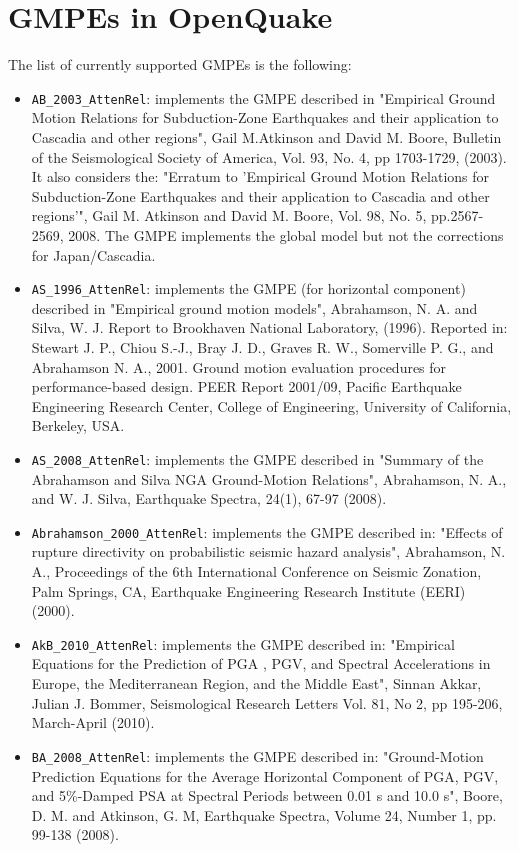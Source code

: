 \section{GMPEs in OpenQuake}
\label{app:gmpes}
The list of currently supported GMPEs is the following:
\begin{itemize}
\item \Verb+AB_2003_AttenRel+: implements the GMPE described in "Empirical Ground Motion Relations for Subduction-Zone Earthquakes and their application to Cascadia and other regions", Gail M.Atkinson and David M. Boore, Bulletin of the Seismological Society of America, Vol. 93, No. 4, pp 1703-1729, (2003).  It also considers the: "Erratum to 'Empirical Ground Motion Relations for Subduction-Zone Earthquakes and their application to Cascadia and other regions'", Gail M. Atkinson and David M. Boore, Vol. 98, No. 5, pp.2567-2569, 2008. The GMPE implements the global model but not the corrections for Japan/Cascadia.
\item \Verb+AS_1996_AttenRel+: implements the GMPE (for horizontal component) described in "Empirical ground motion models", Abrahamson, N. A. and Silva, W. J. Report to Brookhaven National Laboratory, (1996). Reported in: Stewart J. P., Chiou S.-J., Bray J. D., Graves R. W., Somerville P. G., and Abrahamson N. A., 2001. Ground motion evaluation procedures for performance-based design. PEER Report 2001/09, Pacific Earthquake Engineering Research Center, College of Engineering, University of California, Berkeley, USA.
\item \Verb+AS_2008_AttenRel+: implements the GMPE described in "Summary of the Abrahamson and Silva NGA Ground-Motion Relations", Abrahamson, N. A., and W. J. Silva, Earthquake Spectra, 24(1), 67-97 (2008).
\item \Verb+Abrahamson_2000_AttenRel+: implements the GMPE described in: "Effects of rupture directivity on probabilistic seismic hazard analysis", Abrahamson, N. A., Proceedings of the 6th International Conference on Seismic Zonation, Palm Springs, CA, Earthquake Engineering Research Institute (EERI) (2000).
\item \Verb+AkB_2010_AttenRel+: implements the GMPE described in: "Empirical Equations for the Prediction of PGA , PGV, and Spectral Accelerations in Europe, the Mediterranean Region, and the Middle East", Sinnan Akkar, Julian J. Bommer, Seismological Research Letters Vol. 81, No 2,  pp 195-206, March-April (2010).
\item \Verb+BA_2008_AttenRel+: implements the GMPE described in: "Ground-Motion Prediction Equations for the Average Horizontal Component of PGA, PGV, and 5\%-Damped PSA at Spectral Periods between 0.01 s and 10.0 s",  Boore, D. M. and Atkinson, G. M, Earthquake Spectra, Volume 24, Number 1, pp. 99-138 (2008).
\end{itemize}